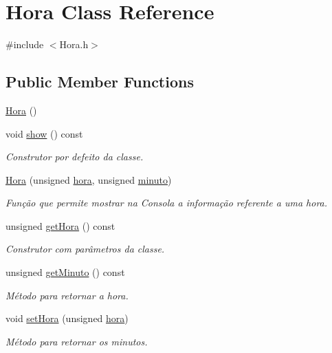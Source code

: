 \hypertarget{class_hora}{\section{Hora Class Reference}
\label{class_hora}
}


{\ttfamily \#include $<$Hora.\+h$>$}

\subsection*{Public Member Functions}
\begin{DoxyCompactItemize}
\item 
\hyperlink{class_hora_a90c18369977bbf1bf3a7370d8ea9e9ae}{Hora} ()
\item 
void \hyperlink{class_hora_a22a4cc9c0bd37db37040680d9e772221}{show} () const 
\begin{DoxyCompactList}\small\item\em Construtor por defeito da classe. \end{DoxyCompactList}\item 
\hyperlink{class_hora_ac2b1f6c87010f4c8af8c3f1986c02b23}{Hora} (unsigned \hyperlink{class_hora_ab901e62ae1158965687dc736a45ee8fe}{hora}, unsigned \hyperlink{class_hora_a9d33ce2d8a3f4b3d05b2a3c6df782fa4}{minuto})
\begin{DoxyCompactList}\small\item\em Função que permite mostrar na Consola a informação referente a uma hora. \end{DoxyCompactList}\item 
unsigned \hyperlink{class_hora_ae55080cc8706bcbf135036edcc4112a5}{get\+Hora} () const 
\begin{DoxyCompactList}\small\item\em Construtor com parâmetros da classe. \end{DoxyCompactList}\item 
unsigned \hyperlink{class_hora_adccaf5d0c9e674462f77b31ae05bdb86}{get\+Minuto} () const 
\begin{DoxyCompactList}\small\item\em Método para retornar a hora. \end{DoxyCompactList}\item 
void \hyperlink{class_hora_afc47b74f8d5673565ebe3de1bbfb92a6}{set\+Hora} (unsigned \hyperlink{class_hora_ab901e62ae1158965687dc736a45ee8fe}{hora})
\begin{DoxyCompactList}\small\item\em Método para retornar os minutos. \end{DoxyCompactList}\item 

\end{DoxyCompactItemize}
